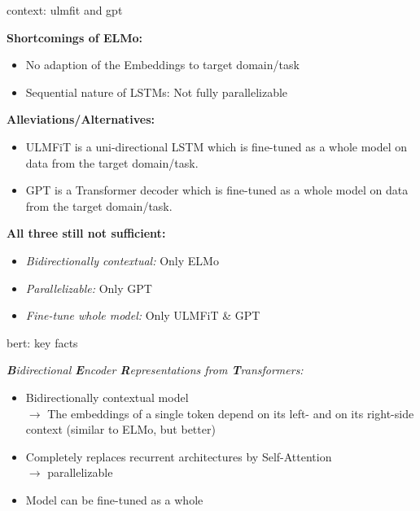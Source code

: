 \begin{frame}{context: ulmfit and gpt}

\vfill

	\textbf{Shortcomings of ELMo:}

	\begin{itemize}
		\item No adaption of the Embeddings to target domain/task
		\item Sequential nature of LSTMs: Not fully parallelizable 
	\end{itemize}
	
	\textbf{Alleviations/Alternatives:}

	\begin{itemize}
		\item ULMFiT  is a uni-directional LSTM which is fine-tuned as a whole model on data from the target domain/task.
		\item GPT  is a Transformer decoder which is fine-tuned as a whole model on data from the target domain/task.
	\end{itemize}
	
	\textbf{All three still not sufficient:}

	\begin{itemize}
		\item \textit{Bidirectionally contextual:} Only ELMo 
		\item \textit{Parallelizable:} Only GPT
		\item \textit{Fine-tune whole model:} Only ULMFiT \& GPT
	\end{itemize}
	
\vfill


\end{frame}


\begin{frame}{bert: key facts}

\vfill

\textit{\textbf{B}idirectional \textbf{E}ncoder \textbf{R}epresentations from \textbf{T}ransformers:}

\vspace{.5cm}

\begin{itemize}
		\item Bidirectionally contextual model\\
					$\to$ The embeddings of a single token depend on its left- and on its right-side context (similar to ELMo, but better)
		\item Completely replaces recurrent architectures by Self-Attention\\
					$\to$ parallelizable
		\item Model can be fine-tuned as a whole
\end{itemize}

\vfill

\end{frame}

